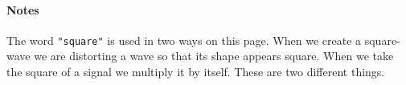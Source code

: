 \paragraph{Notes}
\dag \label{squaremeaning}The word \verb+"square"+ is used in two ways on this page. When we create a square-wave
we are distorting a wave so that its shape appears square. When we take the square of a signal
we multiply it by itself. These are two different things.
 
